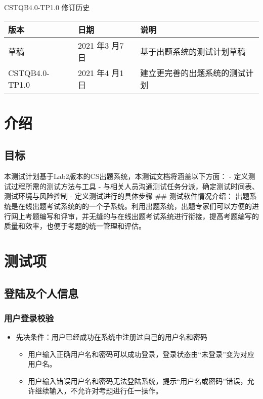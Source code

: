 \documentclass[hyperref, a4paper]{ctexart}
\providecommand{\tightlist}{%
  \setlength{\itemsep}{0pt}\setlength{\parskip}{0pt}}
\begin{document}
CSTQB4.0-TP1.0 修订历史

\begin{tabular}{|p{2cm}|p{3.3cm}|p{8cm}|}
\hline
版本 & 日期 & 说明\\
\hline
草稿 & 2021 年3 月7 日 & 基于出题系统的测试计划草稿\\
\hline
CSTQB4.0-TP1.0 & 2021 年4 月1 日 & 建立更完善的出题系统的测试计划\\
\hline
\end{tabular}

\hypertarget{ux4ecbux7ecd}{%
\section{介绍}\label{ux4ecbux7ecd}}

\hypertarget{ux76eeux6807}{%
\subsection{目标}\label{ux76eeux6807}}

本测试计划基于Lab2版本的CS出题系统，本测试文档将涵盖以下方面： -
定义测试过程所需的测试方法与工具 -
与相关人员沟通测试任务分派，确定测试时间表、测试环境与风险控制 -
定义测试进行的具体步骤 \#\# 测试软件情况介绍：
出题系统是在线出题考试系统的的一个子系统。利用出题系统，出题专家们可以方便的进行网上考题编写和评审，并无缝的与在线出题考试系统进行衔接，提高考题编写的质量和效率，也便于考题的统一管理和评估。

\hypertarget{ux6d4bux8bd5ux9879}{%
\section{测试项}\label{ux6d4bux8bd5ux9879}}

\hypertarget{ux767bux9646ux53caux4e2aux4ebaux4fe1ux606f}{%
\subsection{登陆及个人信息}\label{ux767bux9646ux53caux4e2aux4ebaux4fe1ux606f}}

\hypertarget{ux7528ux6237ux767bux5f55ux6821ux9a8c}{%
\subsubsection{用户登录校验}\label{ux7528ux6237ux767bux5f55ux6821ux9a8c}}

\begin{itemize}
\tightlist
\item
  先决条件：用户已经成功在系统中注册过自己的用户名和密码

  \begin{itemize}
  \tightlist
  \item
    用户输入正确用户名和密码可以成功登录，登录状态由``未登录''变为对应用户名。
  \item
    用户输入错误用户名和密码无法登陆系统，提示``用户名或密码''错误，允许继续输入，不允许对考题进行任一操作。
  \end{itemize}
\end{itemize}
\end{document}
